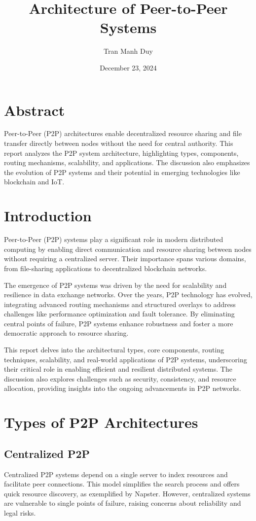 \documentclass[12pt]{article}
\title{Architecture of Peer-to-Peer Systems}
\author{Tran Manh Duy}
\date{December 23, 2024}
\begin{document}
\maketitle

\tableofcontents
\newpage

\section*{Abstract}
Peer-to-Peer (P2P) architectures enable decentralized resource sharing and file transfer directly between nodes without the need for central authority. This report analyzes the P2P system architecture, highlighting types, components, routing mechanisms, scalability, and applications. The discussion also emphasizes the evolution of P2P systems and their potential in emerging technologies like blockchain and IoT.

\section{Introduction}
Peer-to-Peer (P2P) systems play a significant role in modern distributed computing by enabling direct communication and resource sharing between nodes without requiring a centralized server. Their importance spans various domains, from file-sharing applications to decentralized blockchain networks.

The emergence of P2P systems was driven by the need for scalability and resilience in data exchange networks. Over the years, P2P technology has evolved, integrating advanced routing mechanisms and structured overlays to address challenges like performance optimization and fault tolerance. By eliminating central points of failure, P2P systems enhance robustness and foster a more democratic approach to resource sharing.

This report delves into the architectural types, core components, routing techniques, scalability, and real-world applications of P2P systems, underscoring their critical role in enabling efficient and resilient distributed systems. The discussion also explores challenges such as security, consistency, and resource allocation, providing insights into the ongoing advancements in P2P networks.

\section{Types of P2P Architectures}

\subsection{Centralized P2P}
Centralized P2P systems depend on a single server to index resources and facilitate peer connections. This model simplifies the search process and offers quick resource discovery, as exemplified by Napster. However, centralized systems are vulnerable to single points of failure, raising concerns about reliability and legal risks.
\end{document}
